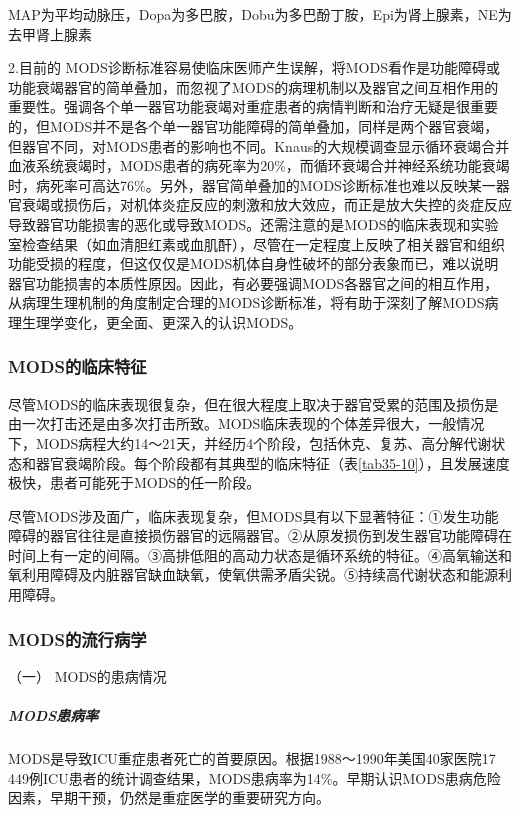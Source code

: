 MAP为平均动脉压，Dopa为多巴胺，Dobu为多巴酚丁胺，Epi为肾上腺素，NE为去甲肾上腺素

2.目前的
MODS诊断标准容易使临床医师产生误解，将MODS看作是功能障碍或功能衰竭器官的简单叠加，而忽视了MODS的病理机制以及器官之间互相作用的重要性。强调各个单一器官功能衰竭对重症患者的病情判断和治疗无疑是很重要的，但MODS并不是各个单一器官功能障碍的简单叠加，同样是两个器官衰竭，但器官不同，对MODS患者的影响也不同。Knaus的大规模调查显示循环衰竭合并血液系统衰竭时，MODS患者的病死率为20\%，而循环衰竭合并神经系统功能衰竭时，病死率可高达76\%。另外，器官简单叠加的MODS诊断标准也难以反映某一器官衰竭或损伤后，对机体炎症反应的刺激和放大效应，而正是放大失控的炎症反应导致器官功能损害的恶化或导致MODS。还需注意的是MODS的临床表现和实验室检查结果（如血清胆红素或血肌酐），尽管在一定程度上反映了相关器官和组织功能受损的程度，但这仅仅是MODS机体自身性破坏的部分表象而已，难以说明器官功能损害的本质性原因。因此，有必要强调MODS各器官之间的相互作用，从病理生理机制的角度制定合理的MODS诊断标准，将有助于深刻了解MODS病理生理学变化，更全面、更深入的认识MODS。

\subsubsection{MODS的临床特征}

尽管MODS的临床表现很复杂，但在很大程度上取决于器官受累的范围及损伤是由一次打击还是由多次打击所致。MODS临床表现的个体差异很大，一般情况下，MODS病程大约14～21天，并经历4个阶段，包括休克、复苏、高分解代谢状态和器官衰竭阶段。每个阶段都有其典型的临床特征（表\ref{tab35-10}），且发展速度极快，患者可能死于MODS的任一阶段。

尽管MODS涉及面广，临床表现复杂，但MODS具有以下显著特征：①发生功能障碍的器官往往是直接损伤器官的远隔器官。②从原发损伤到发生器官功能障碍在时间上有一定的间隔。③高排低阻的高动力状态是循环系统的特征。④高氧输送和氧利用障碍及内脏器官缺血缺氧，使氧供需矛盾尖锐。⑤持续高代谢状态和能源利用障碍。

\subsubsection{MODS的流行病学}

\hypertarget{text00094.htmlux5cux23CHP3-11-3-5-1}{}
（一） MODS的患病情况

\subparagraph{MODS患病率}

MODS是导致ICU重症患者死亡的首要原因。根据1988～1990年美国40家医院17
449例ICU患者的统计调查结果，MODS患病率为14\%。早期认识MODS患病危险因素，早期干预，仍然是重症医学的重要研究方向。

